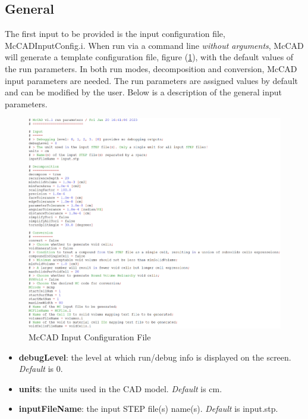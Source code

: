 \documentclass[12pt, a4paper, titlepage]{article}
\begin{document}
  \subsection{General}
	The first input to be provided is the input configuration file, McCADInputConfig.i.  When run via a command line \emph{without arguments}, McCAD will generate a template configuration file, figure (\ref{fig:config}), with the default values of the run parameters. In both run modes, decomposition and conversion, McCAD input parameters are needed. The run parameters are assigned values by default and can be modified by the user. Below is a description of the general input parameters.
	\begin{figure}[h!]
		\centering
		\includegraphics[scale=0.42]{figures/configFile.png}
		\caption{McCAD Input Configuration File}
		\label{fig:config}
	\end{figure}
	\begin{itemize}
		\item \textbf{debugLevel}: the level at which run/debug info is displayed on the screen. \emph{Default} is 0.
		\item \textbf{units}: the units used in the CAD model. \emph{Default} is cm.
		\item \textbf{inputFileName}: the input STEP file(s) name(s). \emph{Default} is input.stp.
	\end{itemize}
\end{document}

